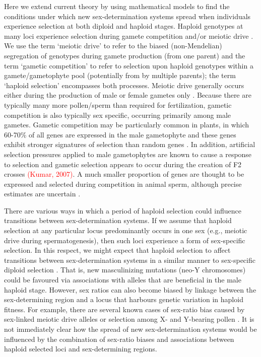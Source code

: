 \documentclass[12pt]{article}
\begin{document}
Here we extend current theory %
by using mathematical models to find the conditions under which new sex-determination systems spread when individuals experience selection at both diploid and haploid stages. 
Haploid genotypes at many loci experience selection during gamete competition and/or meiotic drive \citep{Mulcahy:1996ha,JOSEPH:2004haa}.
We use the term `meiotic drive' to refer to the biased (non-Mendelian) segregation of genotypes during gamete production (from one parent) and the term `gametic competition' to refer to selection upon haploid genotypes within a gamete/gametophyte pool (potentially from by multiple parents); the term `haploid selection' encompasses both processes. 
Meiotic drive generally occurs either during the production of male or female gametes only \citep{Ubeda:2005gw,Lindholm:2016cw}.
Because there are typically many more pollen/sperm than required for fertilization, gametic competition is also typically sex specific, occurring primarily among male gametes.
Gametic competition may be particularly common in plants, in which 60-70\% of all genes are expressed in the male gametophyte and these genes exhibit stronger signatures of selection than random genes \citep{Borg:2009jpa,Arunkumar:2013iq,Gossmann:2014dua}.
In addition, artificial selection pressures applied to male gametophytes are known to cause a response to selection \citep[e.g.,][]{Hormaza:1996cv,Ravikumar:2003uo,Hedhly:2004iv,Clarke:2004ir} and gametic selection appears to occur during the creation of F2 crosses \textcolor{red}{(Kumar, 2007)}. 
A much smaller proportion of genes are thought to be expressed and selected during competition in animal sperm, although precise estimates are uncertain \citep{Zheng:2001fi,JOSEPH:2004haa,Vibranovski:2010et,Immler:2014im}. 

There are various ways in which a period of haploid selection could influence transitions between sex-determination systems. 
If we assume that haploid selection at any particular locus predominantly occurs in one sex (e.g., meiotic drive during spermatogenesis), then such loci experience a form of sex-specific selection. 
In this respect, we might expect that haploid selection to affect transitions between sex-determination systems in a similar manner to sex-specific diploid selection \citep[as explored by][]{vanDoorn:2007eu,vanDoorn:2010hu}. 
That is, new masculinizing mutations (neo-Y chromosomes) could be favoured via associations with alleles that are beneficial in the male haploid stage. 
However, sex ratios can also become biased by linkage between the sex-determining region and a locus that harbours genetic variation in haploid fitness. 
For example, there are several known cases of sex-ratio bias caused by sex-linked meiotic drive alleles \citep[][Chapter 3]{Burt:2006} or selection among X- and Y-bearing pollen \citep{Lloyd:1974tz,Conn:1981uw,Stehlik:2005ul,Stehlik:2006to,Field:2012fd,Field:2013cc}. 
It is not immediately clear how the spread of new sex-determination systems would be influenced by the combination of sex-ratio biases and associations between haploid selected loci and sex-determining regions. 
\end{document}
